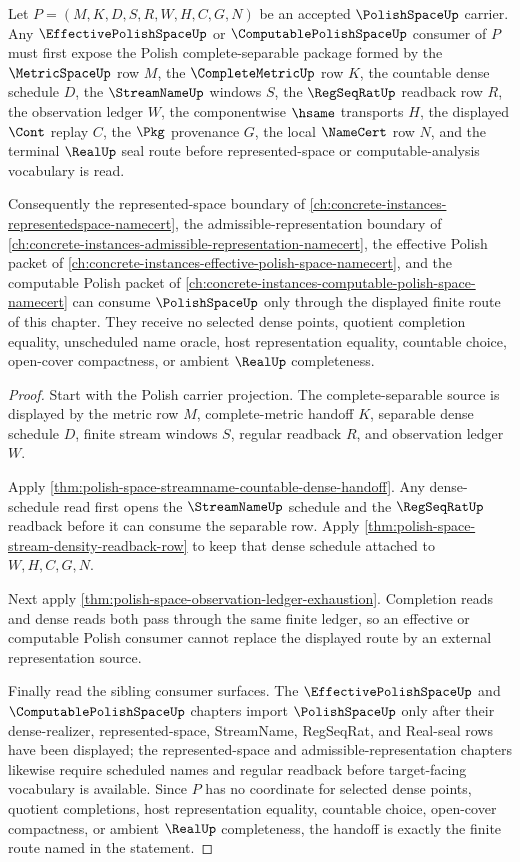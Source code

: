 \begin{theorem}
\label{thm:polish-space-effective-representation-handoff}
Let $P=(M,K,D,S,R,W,H,C,G,N)$ be an accepted $\PolishSpaceUp$ carrier. Any $\EffectivePolishSpaceUp$ or $\ComputablePolishSpaceUp$ consumer of $P$ must first expose the Polish complete-separable package formed by the $\MetricSpaceUp$ row $M$, the $\CompleteMetricUp$ row $K$, the countable dense schedule $D$, the $\StreamNameUp$ windows $S$, the $\RegSeqRatUp$ readback row $R$, the observation ledger $W$, the componentwise $\hsame$ transports $H$, the displayed $\Cont$ replay $C$, the $\Pkg$ provenance $G$, the local $\NameCert$ row $N$, and the terminal $\RealUp$ seal route before represented-space or computable-analysis vocabulary is read.

Consequently the represented-space boundary of \autoref{ch:concrete-instances-representedspace-namecert}, the admissible-representation boundary of \autoref{ch:concrete-instances-admissible-representation-namecert}, the effective Polish packet of \autoref{ch:concrete-instances-effective-polish-space-namecert}, and the computable Polish packet of \autoref{ch:concrete-instances-computable-polish-space-namecert} can consume $\PolishSpaceUp$ only through the displayed finite route of this chapter. They receive no selected dense points, quotient completion equality, unscheduled name oracle, host representation equality, countable choice, open-cover compactness, or ambient $\RealUp$ completeness.
\end{theorem}
\begin{proof}
Start with the Polish carrier projection. The complete-separable source is displayed by the metric row $M$, complete-metric handoff $K$, separable dense schedule $D$, finite stream windows $S$, regular readback $R$, and observation ledger $W$.

Apply \autoref{thm:polish-space-streamname-countable-dense-handoff}. Any dense-schedule read first opens the $\StreamNameUp$ schedule and the $\RegSeqRatUp$ readback before it can consume the separable row. Apply \autoref{thm:polish-space-stream-density-readback-row} to keep that dense schedule attached to $W,H,C,G,N$.

Next apply \autoref{thm:polish-space-observation-ledger-exhaustion}. Completion reads and dense reads both pass through the same finite ledger, so an effective or computable Polish consumer cannot replace the displayed route by an external representation source.

Finally read the sibling consumer surfaces. The $\EffectivePolishSpaceUp$ and $\ComputablePolishSpaceUp$ chapters import $\PolishSpaceUp$ only after their dense-realizer, represented-space, StreamName, RegSeqRat, and Real-seal rows have been displayed; the represented-space and admissible-representation chapters likewise require scheduled names and regular readback before target-facing vocabulary is available. Since $P$ has no coordinate for selected dense points, quotient completions, host representation equality, countable choice, open-cover compactness, or ambient $\RealUp$ completeness, the handoff is exactly the finite route named in the statement.
\end{proof}
